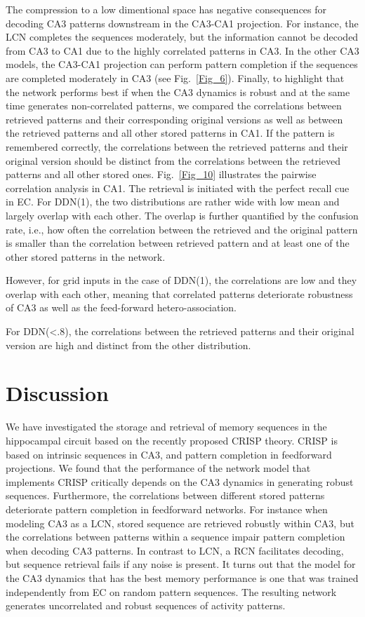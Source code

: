 \documentclass[utf8]{frontiersSCNS} %
\begin{document}
The compression to a low dimentional space has negative consequences for decoding CA3 patterns downstream in the CA3-CA1 projection. For instance, the LCN completes the sequences moderately, but the information cannot be decoded from CA3 to CA1 due to the highly correlated patterns in CA3. In the other CA3 models, the CA3-CA1 projection can perform pattern completion if the sequences are completed moderately in CA3 (see Fig.~\ref{Fig_6}). Finally, to highlight that the network performs best if when the CA3 dynamics is robust and at the same time generates non-correlated patterns, we compared the correlations between retrieved patterns and their corresponding original versions as well as between the retrieved patterns and all other stored patterns in CA1. If the pattern is remembered correctly, the correlations between the retrieved patterns and their original version should be distinct from the correlations between the retrieved patterns and all other stored ones. Fig.~\ref{Fig_10} illustrates the pairwise correlation analysis in CA1. The retrieval is initiated with the perfect recall cue in EC. For DDN(1), the two distributions are rather wide with low mean and largely overlap with each other. The overlap is further quantified by the confusion rate, i.e., how often the correlation between the retrieved and the original pattern is smaller than the correlation between retrieved pattern and at least one of the other stored patterns in the network.

However, for grid inputs in the case of DDN(1), the correlations are low and they overlap with each other, meaning that correlated patterns deteriorate robustness of CA3 as well as the feed-forward hetero-association.

 For DDN(<.8), the correlations between the retrieved patterns and their original version are high and distinct from the other distribution.     

\section{Discussion}

We have investigated the storage and retrieval of memory sequences in the hippocampal circuit based on the recently proposed CRISP theory. CRISP is based on intrinsic sequences in CA3, and pattern completion in feedforward projections. We found that the performance of the network model that implements CRISP critically depends on the CA3 dynamics in generating robust sequences. Furthermore, the correlations between different stored patterns deteriorate pattern completion in feedforward networks. For instance when modeling CA3 as a LCN, stored sequence are retrieved robustly within CA3, but the  correlations between patterns within a sequence impair pattern completion when decoding CA3 patterns. In contrast to LCN, a RCN facilitates decoding, but sequence retrieval fails if any noise is present. It turns out that the model for the CA3 dynamics that has the best memory performance is one that was trained independently from EC on random pattern sequences. The resulting network generates uncorrelated and robust sequences of activity patterns. 
\end{document}
